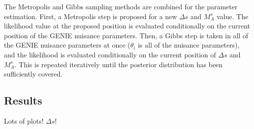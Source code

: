     The Metropolis and Gibbs sampling methods are combined for the parameter
    estimation.  First, a Metropolis step is proposed for a new $\Delta s$ and
    $M_A^s$ value. The likelihood value at the proposed position is evaluated
    conditionally on the current position of the GENIE nuisance parameters.
    Then, a Gibbs step is taken in all of the GENIE nuisance parameters at once
    ($\theta_i$ is all of the nuisance parameters),
    and the likelihood is evaluated conditionally on the current position of
    $\Delta s$ and $M_A^s$. This is repeated iteratively until the posterior
    distribution has been sufficiently covered.

\subsection{Results}\label{sec:results}
  Lots of plots! $\Delta s$!



